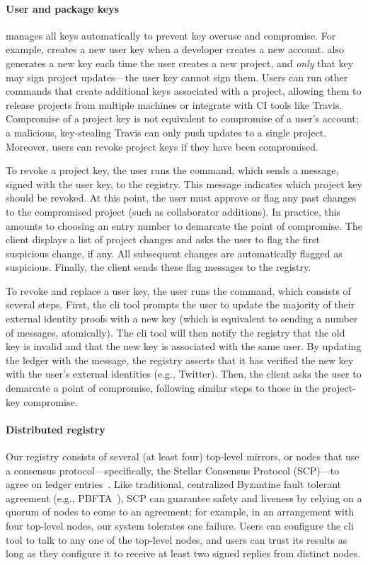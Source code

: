 \paragraph{User and package keys}
\spam{} manages all keys automatically to prevent key overuse and
compromise. For example, \spam{} creates a new user key
when a developer creates a new account. \spam{} also
generates a new key each time the user creates a new project, and \emph{only}
that key may sign project updates---the user key cannot sign them.
Users can run other \spam{} commands that create additional keys
associated with a project, allowing them to release projects from multiple
machines or integrate with CI tools like Travis. Compromise of a project key is not equivalent to
compromise of a user's account; a malicious, key-stealing Travis can
only push updates to a single project. Moreover, users can revoke
project keys if they have been compromised.

To revoke a project key, the user runs the \revokeprojkeycmd{} command, which
sends a message, signed with the user key, to the registry. This message
indicates which project key should be revoked. At this point, the user
must approve or flag any past changes to the compromised project
(such as collaborator additions). In practice, this amounts to choosing an
entry number to demarcate the point of compromise. The \spam{} client
displays a list of project changes and asks the user to flag the first
suspicious change, if any. All subsequent changes are
automatically flagged as suspicious. Finally, the \spam client sends
these flag messages to the registry.

To revoke and replace a user key, the user runs the \replaceuserkeycmd{} command, which
consists of several steps. First, the cli tool prompts the user to update
the majority of their external identity proofs with a new key (which is equivalent to
sending a number of \proveidentity messages, atomically). The cli tool
will then notify the registry that the old key is invalid and that the new key is associated
with the same user. By updating the ledger with the \replaceuserkey{} message, the
registry asserts that it has verified the new key with the user's external identities
(e.g., Twitter). Then, the \spam client asks the user to demarcate
a point of compromise, following similar steps to those in the project-key
compromise. 

\paragraph{Distributed registry}
Our registry consists of several (at least four) top-level mirrors, or nodes
that use a consensus protocol---specifically, the Stellar Consensus
Protocol (SCP)---to agree on ledger entries~\cite{stellar}.
Like traditional, centralized Byzantine fault tolerant
agreement (e.g., PBFTA~\cite{pbfts}), SCP can guarantee safety and liveness by
relying on a quorum of nodes to come to an agreement; for example, in an
arrangement with four top-level nodes, our system tolerates one failure.
Users can configure the \spam{} cli tool to talk to any one of the top-level
nodes, and users can trust its results as long as they configure it
to receive at least two signed replies from distinct nodes.

